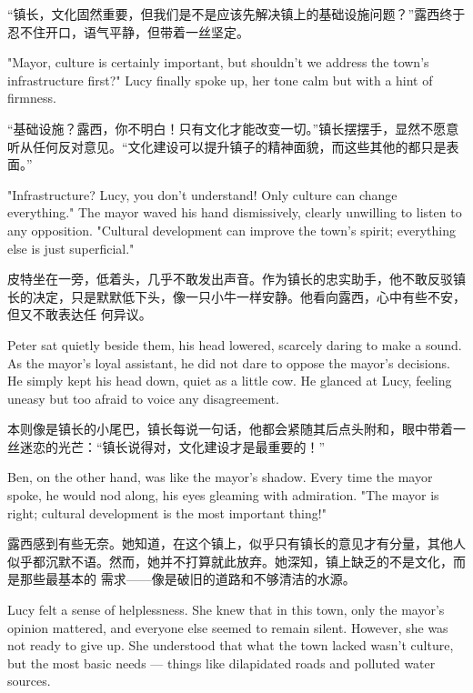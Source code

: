 “镇长，文化固然重要，但我们是不是应该先解决镇上的基础设施问题？”露西终于忍不住开口，语气平静，但带着一丝坚定。

\begin{flushright} "Mayor, culture is certainly important, but shouldn't we
    address the town's infrastructure first?" Lucy finally spoke up, her tone
    calm
    but with a hint of firmness. \end{flushright}

“基础设施？露西，你不明白！只有文化才能改变一切。”镇长摆摆手，显然不愿意听从任何反对意见。“文化建设可以提升镇子的精神面貌，而这些其他的都只是表面。”

\begin{flushright} "Infrastructure? Lucy, you don't understand! Only culture
    can change everything." The mayor waved his hand dismissively, clearly
    unwilling to listen to any opposition. "Cultural development can improve
    the
    town's spirit; everything else is just superficial." \end{flushright}

皮特坐在一旁，低着头，几乎不敢发出声音。作为镇长的忠实助手，他不敢反驳镇长的决定，只是默默低下头，像一只小牛一样安静。他看向露西，心中有些不安，但又不敢表达任
何异议。

\begin{flushright} Peter sat quietly beside them, his head lowered, scarcely
    daring to make a sound. As the mayor's loyal assistant, he did not dare to
    oppose the mayor’s decisions. He simply kept his head down, quiet as a
    little
    cow. He glanced at Lucy, feeling uneasy but too afraid to voice any
    disagreement. \end{flushright}

本则像是镇长的小尾巴，镇长每说一句话，他都会紧随其后点头附和，眼中带着一丝迷恋的光芒：“镇长说得对，文化建设才是最重要的！”

\begin{flushright} Ben, on the other hand, was like the mayor's shadow. Every
    time the mayor spoke, he would nod along, his eyes gleaming with
    admiration.
    "The mayor is right; cultural development is the most important thing!"
\end{flushright}

露西感到有些无奈。她知道，在这个镇上，似乎只有镇长的意见才有分量，其他人似乎都沉默不语。然而，她并不打算就此放弃。她深知，镇上缺乏的不是文化，而是那些最基本的
需求——像是破旧的道路和不够清洁的水源。

\begin{flushright} Lucy felt a sense of helplessness. She knew that in this
    town, only the mayor’s opinion mattered, and everyone else seemed to remain
    silent. However, she was not ready to give up. She understood that what the
    town lacked wasn’t culture, but the most basic needs — things like
    dilapidated
    roads and polluted water sources. \end{flushright}

